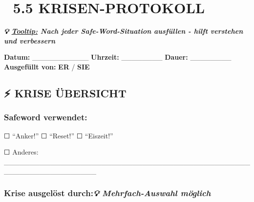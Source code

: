 %


\hypertarget{krisen-protokoll}{%
\section{\texorpdfstring{\textbf{🚨 5.5 KRISEN-PROTOKOLL}}{🚨 5.5 KRISEN-PROTOKOLL}}\label{krisen-protokoll}}

\emph{\textbf{💡 \ul{Tooltip:} Nach jeder Safe-Word-Situation ausfüllen - hilft verstehen und verbessern}}

\textbf{Datum:} \_\_\_\_\_\_\_\_\_\_\_ \textbf{Uhrzeit:} \_\_\_\_\_\_\_\_ \textbf{Dauer:} \_\_\_\_\_\_\_\_ \textbf{Ausgefüllt von:} \textbf{ER} / \textbf{SIE}

\hypertarget{krise-uxfcbersicht}{%
\subsection{\texorpdfstring{\textbf{⚡ KRISE ÜBERSICHT}}{⚡ KRISE ÜBERSICHT}}\label{krise-uxfcbersicht}}

\hypertarget{safeword-verwendet}{%
\subsubsection{\texorpdfstring{\textbf{Safeword verwendet:}}{Safeword verwendet:}}\label{safeword-verwendet}}

☐ ``Anker!'' ☐ ``Reset!'' ☐ ``Eiszeit!''

☐ Anderes: \_\_\_\_\_\_\_\_\_\_\_\_\_\_\_\_\_\_\_\_\_\_\_\_\_\_\_\_\_\_\_\_\_\_\_\_\_\_\_\_\_\_\_\_\_\_\_\_\_\_\_\_\_\_\_\_\_\_\_\_\_\_\_\_\_\_

\hypertarget{krise-ausgeluxf6st-durch-mehrfach-auswahl-muxf6glich}{%
\subsubsection{\texorpdfstring{\textbf{Krise ausgelöst durch:\emph{💡 Mehrfach-Auswahl möglich}} }{Krise ausgelöst durch:💡 Mehrfach-Auswahl möglich }}\label{krise-ausgeluxf6st-durch-mehrfach-auswahl-muxf6glich}}

